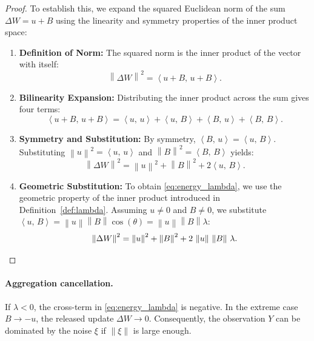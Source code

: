 \documentclass{article}
\theoremstyle{plain}
\theoremstyle{definition}
\theoremstyle{remark}
\numberwithin{theorem}{section}
\numberwithin{definition}{section}
\numberwithin{remark}{section}
\numberwithin{lemma}{section}
\numberwithin{assumption}{section}
\newcommand{\ip}[2]{\left\langle #1,\,#2 \right\rangle}
\newcommand{\norm}[1]{\left\lVert #1 \right\rVert}
\newcommand{\utarget}{u}
\begin{document}
\begin{proof}
To establish this, we expand the squared Euclidean norm of the sum $\Delta W = \utarget + B$ using the linearity and symmetry properties of the inner product space:

\begin{enumerate}[leftmargin=*]
    \item \textbf{Definition of Norm:} The squared norm is the inner product of the vector with itself:
    \begin{equation*}
    \norm{\Delta W}^2 = \ip{\utarget + B}{\utarget + B}.
    \end{equation*}

    \item \textbf{Bilinearity Expansion:} Distributing the inner product across the sum gives four terms:
    \begin{equation*}
    \ip{\utarget + B}{\utarget + B} = \ip{\utarget}{\utarget} + \ip{\utarget}{B} + \ip{B}{\utarget} + \ip{B}{B}.
    \end{equation*}

    \item \textbf{Symmetry and Substitution:} By symmetry, $\ip{B}{\utarget} = \ip{\utarget}{B}$. Substituting $\norm{\utarget}^2 = \ip{\utarget}{\utarget}$ and $\norm{B}^2 = \ip{B}{B}$ yields:
    \begin{equation*}
    \norm{\Delta W}^2 = \norm{\utarget}^2 + \norm{B}^2 + 2\ip{\utarget}{B}.
    \end{equation*}

    \item \textbf{Geometric Substitution:} To obtain \eqref{eq:energy_lambda}, we use the geometric property of the inner product introduced in Definition~\ref{def:lambda}. Assuming $\utarget \neq 0$ and $B \neq 0$, we substitute $\ip{\utarget}{B} = \norm{\utarget}\norm{B}\cos(\theta) = \norm{\utarget}\norm{B}\lambda$:
    \begin{equation*}
    \norm{\Delta W}^2 = \norm{\utarget}^2 + \norm{B}^2 + 2\,\norm{\utarget}\,\norm{B}\,\lambda. \qedhere
    \end{equation*}
\end{enumerate}
\end{proof}

\paragraph{Aggregation cancellation.}
If $\lambda<0$, the cross-term in \eqref{eq:energy_lambda} is negative. In the extreme case $B \to -\utarget$, the released update $\Delta W \to 0$.
Consequently, the observation $Y$ can be dominated by the noise $\xi$ if $\norm{\xi}$ is large enough.
\end{document}
